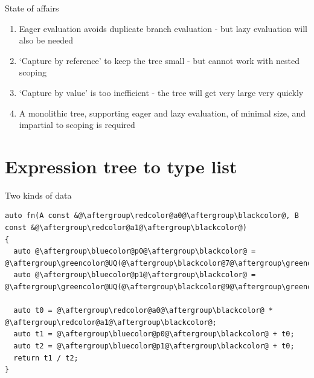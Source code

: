 \documentclass[xcolor=dvipsnames]{beamer}
\begin{document}
\begin{frame}[fragile]{State of affairs}
  \begin{enumerate}
  \item Eager evaluation avoids duplicate branch evaluation - but lazy evaluation will also be needed \vspace{5mm}
  \item `Capture by reference' to keep the tree small - but cannot work with nested scoping \vspace{5mm}
  \item `Capture by value' is too inefficient - the tree will get very large very quickly \vspace{5mm}
  \item A monolithic tree, supporting eager and lazy evaluation, of minimal size, and impartial to scoping is required \vspace{5mm}
  \end{enumerate}
\end{frame}


\section{Expression tree to type list}

\begin{frame}[fragile]{Two kinds of data}
\begin{lstlisting}
auto fn(A const &@\aftergroup\redcolor@a0@\aftergroup\blackcolor@, B const &@\aftergroup\redcolor@a1@\aftergroup\blackcolor@)
{
  auto @\aftergroup\bluecolor@p0@\aftergroup\blackcolor@ = @\aftergroup\greencolor@UQ(@\aftergroup\blackcolor@7@\aftergroup\greencolor@)@\aftergroup\blackcolor@;
  auto @\aftergroup\bluecolor@p1@\aftergroup\blackcolor@ = @\aftergroup\greencolor@UQ(@\aftergroup\blackcolor@9@\aftergroup\greencolor@)@\aftergroup\blackcolor@;

  auto t0 = @\aftergroup\redcolor@a0@\aftergroup\blackcolor@ * @\aftergroup\redcolor@a1@\aftergroup\blackcolor@;
  auto t1 = @\aftergroup\bluecolor@p0@\aftergroup\blackcolor@ + t0;
  auto t2 = @\aftergroup\bluecolor@p1@\aftergroup\blackcolor@ + t0;
  return t1 / t2;
}
\end{lstlisting}
\end{frame}
\end{document}

